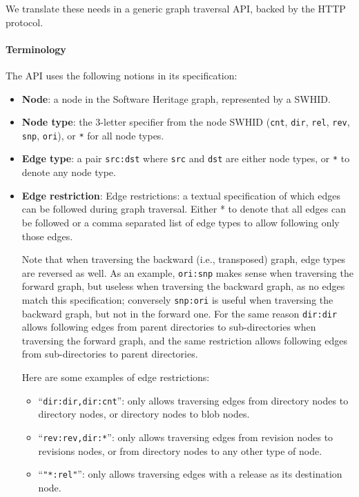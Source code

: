 We translate these needs in a generic graph traversal API, backed by the HTTP
protocol.

\paragraph*{Terminology}
The API uses the following notions in its specification:

\begin{itemize}
    \item \textbf{Node}: a node in the Software Heritage graph, represented by
        a \gls{SWHID}.
    \item \textbf{Node type}: the 3-letter specifier from the node \gls{SWHID}
        (\texttt{cnt}, \texttt{dir}, \texttt{rel}, \texttt{rev}, \texttt{snp},
        \texttt{ori}), or \texttt{*} for all node types.
    \item \textbf{Edge type}: a pair \texttt{src:dst} where \texttt{src} and
        \texttt{dst} are either node types, or \texttt{*} to denote any node
        type.
    \item \textbf{Edge restriction}: Edge restrictions: a textual specification
        of which edges can be followed during graph traversal. Either * to
        denote that all edges can be followed or a comma separated list of edge
        types to allow following only those edges.

        Note that when traversing the backward (i.e., transposed) graph, edge
        types are reversed as well. As an example, \texttt{ori:snp} makes
        sense when traversing the forward graph, but useless when traversing
        the backward graph, as no edges match this specification; conversely
        \texttt{snp:ori} is useful when traversing the backward graph, but not
        in the forward one. For the same reason \texttt{dir:dir} allows
        following edges from parent directories to sub-directories when
        traversing the forward graph, and the same restriction allows following
        edges from sub-directories to parent directories.

        Here are some examples of edge restrictions:

        \begin{itemize}
            \item ``\texttt{dir:dir,dir:cnt}'': only allows traversing edges
                from directory nodes to directory nodes, or directory nodes to
                blob nodes.

            \item ``\texttt{rev:rev,dir:*}'': only allows traversing edges from
                revision nodes to revisions nodes, or from directory nodes to
                any other type of node.

            \item ``\texttt{"*:rel"}'': only allows traversing edges with a
                release as its destination node.
        \end{itemize}
\end{itemize}

